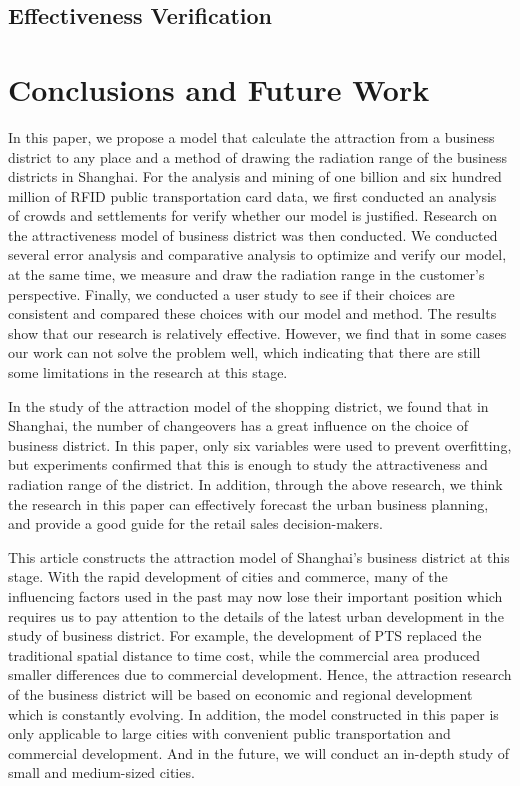 \documentclass[journal]{IEEEtran}
\begin{document}
\subsection{Effectiveness Verification}





\section{Conclusions and Future Work}

In this paper, we propose a model that calculate the attraction from a business district to any place and a method of drawing the radiation range of the business districts in Shanghai. For the analysis and mining of one billion and six hundred million of RFID public transportation card data, we first conducted an analysis of crowds and settlements for verify whether our model is justified. Research on the attractiveness model of business district was then conducted. We conducted several error analysis and comparative analysis to optimize and verify our model, at the same time, we measure and draw the radiation range in the customer's perspective. Finally, we conducted a user study to see if their choices are consistent and compared these choices with our model and method. The results show that our research is relatively effective. However, we find that in some cases our work can not solve the problem well, which indicating that there are still some limitations in the research at this stage.

In the study of the attraction model of the shopping district, we found that in Shanghai, the number of changeovers has a great influence on the choice of business district. In this paper, only six variables were used to prevent overfitting, but experiments confirmed that this is enough to study the attractiveness and radiation range of the district. In addition, through the above research, we think the research in this paper can effectively forecast the urban business planning, and provide a good guide for the retail sales decision-makers.

This article constructs the attraction model of Shanghai's business district at this stage. With the rapid development of cities and commerce, many of the influencing factors used in the past may now lose their important position which requires us to pay attention to the details of the latest urban development in the study of business district. For example, the development of PTS replaced the traditional spatial distance to time cost, while the commercial area produced smaller differences due to commercial development. Hence, the attraction research of the business district will be based on economic and regional development which is constantly evolving. In addition, the model constructed in this paper is only applicable to large cities with convenient public transportation and commercial development. And in the future, we will conduct an in-depth study of small and medium-sized cities.
\end{document}
